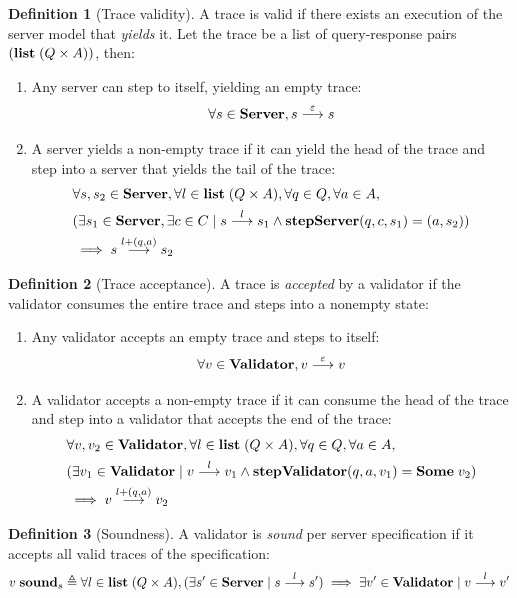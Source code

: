 \documentclass{article}
\theoremstyle{definition}
\newtheorem{definition}{Definition}
\newcommand{\Server}{\ottkw{Server}}
\newcommand{\Validator}{\ottkw{Validator}}
\newcommand{\stepServer}{\ottkw{stepServer}}
\newcommand{\stepValidator}{\ottkw{stepValidator}}
\newcommand{\Some}[1]{\ottkw{Some}\;#1}
\newcommand{\List}{\ottkw{list}\;}
\newcommand{\nil}{\varepsilon}
\newcommand{\yields}[3]{#1\overset{#2}{\longrightarrow}#3}
\newcommand{\accepts}[3]{#1\overset{#2}{\longrightarrow}#3}
\newcommand{\sound}{\ottkw{sound}}
\newcommand{\issound}[2]{#1\;\sound_{#2}}
\begin{document}
\begin{definition}[Trace validity]
  A trace is valid if there exists an execution of the server model that {\em
    yields} it.  Let the trace be a list of query-response pairs $(\List
  (Q\times A))$, then:
  \begin{enumerate}
  \item Any server can step to itself, yielding an empty trace:
    \[\forall s\in\Server, \yields{s}{\nil}{s}\]
  \item A server yields a non-empty trace if it can yield the head of the trace
    and step into a server that yields the tail of the trace:
    \begin{align*}
      &\forall s,s_2\in\Server,\forall l\in\List(Q\times A),\forall q\in Q,\forall a\in A,\\
      &(\exists s_1\in\Server,\exists c\in C\mid\yields{s}{l}{s_1}\wedge
      \stepServer(q,c,s_1)=(a,s_2)) \\
      &\implies \yields{s}{l+(q,a)}{s_2}
    \end{align*}
  \end{enumerate}
\end{definition}

\begin{definition}[Trace acceptance]
  A trace is {\em accepted} by a validator if the validator consumes the entire
  trace and steps into a nonempty state:
  \begin{enumerate}
  \item Any validator accepts an empty trace and steps to itself:
    \[ \forall v\in\Validator,\accepts{v}{\nil}{v} \]
  \item A validator accepts a non-empty trace if it can consume the head of the
    trace and step into a validator that accepts the end of the trace:
    \begin{align*}
      &\forall v,v_2\in\Validator,\forall
      l\in\List(Q\times A),\forall q\in Q, \forall a\in A, \\
      & (\exists v_1\in\Validator\mid\accepts{v}{l}{v_1}\wedge
      \stepValidator(q,a,v_1)=\Some{v_2}) \\ &\implies
      \accepts{v}{l+(q,a)}{v_2}
    \end{align*}
  \end{enumerate}
\end{definition}

\begin{definition}[Soundness]
  A validator is {\em sound} per server specification if it accepts all valid
  traces of the specification:
  \[ \issound{v}{s}\triangleq\forall l\in\List(Q\times A),(\exists s'\in\Server\mid\yields{s}{l}{s'})\implies\exists v'\in\Validator\mid\accepts{v}{l}{v'} \]
\end{definition}
\end{document}
